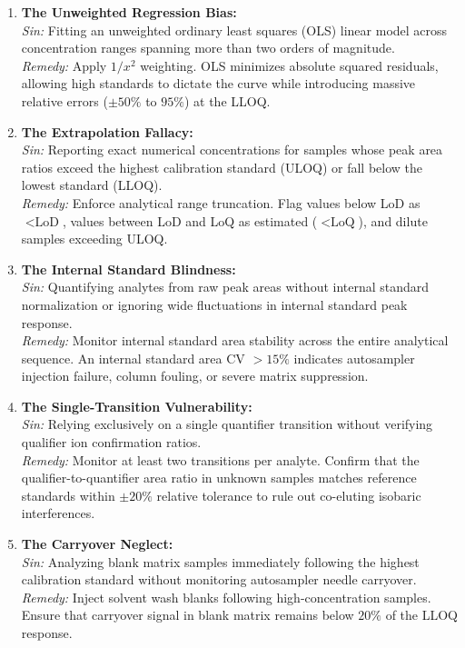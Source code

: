 \documentclass[11pt,twoside,openright]{book}
\begin{document}
\begin{enumerate}
    \item \textbf{The Unweighted Regression Bias:}\\
    \textit{Sin:} Fitting an unweighted ordinary least squares (OLS) linear model across concentration ranges spanning more than two orders of magnitude.\\
    \textit{Remedy:} Apply $1/x^2$ weighting. OLS minimizes absolute squared residuals, allowing high standards to dictate the curve while introducing massive relative errors ($\pm 50\%$ to $95\%$) at the LLOQ.

    \item \textbf{The Extrapolation Fallacy:}\\
    \textit{Sin:} Reporting exact numerical concentrations for samples whose peak area ratios exceed the highest calibration standard (ULOQ) or fall below the lowest standard (LLOQ).\\
    \textit{Remedy:} Enforce analytical range truncation. Flag values below LoD as $<\text{LoD}$, values between LoD and LoQ as estimated ($<\text{LoQ}$), and dilute samples exceeding ULOQ.

    \item \textbf{The Internal Standard Blindness:}\\
    \textit{Sin:} Quantifying analytes from raw peak areas without internal standard normalization or ignoring wide fluctuations in internal standard peak response.\\
    \textit{Remedy:} Monitor internal standard area stability across the entire analytical sequence. An internal standard area CV $> 15\%$ indicates autosampler injection failure, column fouling, or severe matrix suppression.

    \item \textbf{The Single-Transition Vulnerability:}\\
    \textit{Sin:} Relying exclusively on a single quantifier transition without verifying qualifier ion confirmation ratios.\\
    \textit{Remedy:} Monitor at least two transitions per analyte. Confirm that the qualifier-to-quantifier area ratio in unknown samples matches reference standards within $\pm 20\%$ relative tolerance to rule out co-eluting isobaric interferences.

    \item \textbf{The Carryover Neglect:}\\
    \textit{Sin:} Analyzing blank matrix samples immediately following the highest calibration standard without monitoring autosampler needle carryover.\\
    \textit{Remedy:} Inject solvent wash blanks following high-concentration samples. Ensure that carryover signal in blank matrix remains below $20\%$ of the LLOQ response.
\end{enumerate}
\end{document}
